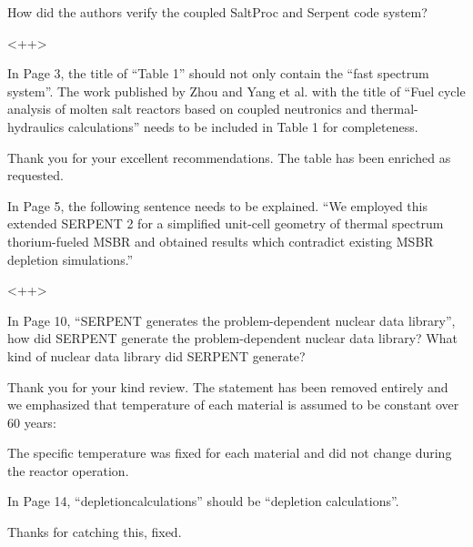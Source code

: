 \documentclass[answers,11pt]{exam}
\begin{document}
\begin{questions}
        \question  How did the authors verify the coupled SaltProc and Serpent 
        code system?  \begin{solution}
                <++>
        \end{solution}

        \question  In Page 3, the title of ``Table 1'' should not only contain 
        the ``fast spectrum system''. The work published by Zhou and Yang et al. 
        with the title of ``Fuel cycle analysis of molten salt reactors based on 
        coupled neutronics and thermal-hydraulics calculations'' needs to be 
        included in Table 1 for completeness.
        \begin{solution}
                Thank you for your excellent recommendations. The table has been 
                enriched as requested.
        \end{solution}

        \question  In Page 5, the following sentence needs to be explained. ``We 
        employed this extended SERPENT 2 for a simplified unit-cell geometry of 
        thermal spectrum thorium-fueled MSBR and obtained results which 
        contradict existing MSBR depletion simulations.''
        \begin{solution}
                <++>
        \end{solution}

        \question  In Page 10, ``SERPENT generates the problem-dependent nuclear 
        data library'', how did SERPENT generate the problem-dependent nuclear 
        data library? What kind of nuclear data library did SERPENT generate?
        \begin{solution}
                Thank you for your kind review. The statement has been removed
		        entirely and we emphasized that temperature of each material is 
		        assumed to be constant over 60 years:
		        
		        The specific temperature was fixed for each material and did 
		        not change during the reactor operation. 
        \end{solution}

        \question  In Page 14, ``depletioncalculations'' should be ``depletion 
        calculations''.
        \begin{solution}
                Thanks for catching this, fixed.
        \end{solution}


\end{questions}
\end{document}
